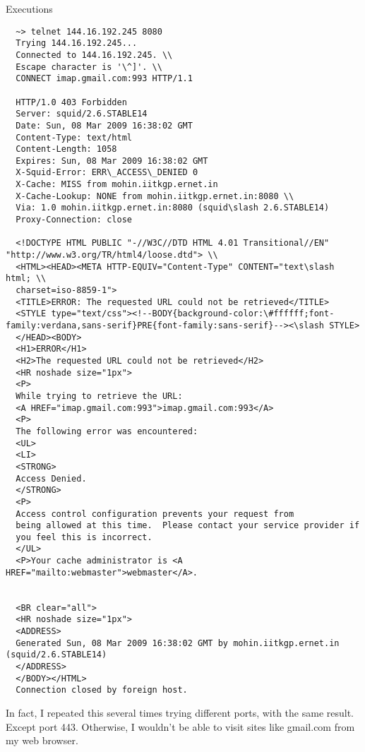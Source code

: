 Executions
\begin{lstlisting}
  ~> telnet 144.16.192.245 8080
  Trying 144.16.192.245...
  Connected to 144.16.192.245. \\
  Escape character is '\^]'. \\
  CONNECT imap.gmail.com:993 HTTP/1.1

  HTTP/1.0 403 Forbidden
  Server: squid/2.6.STABLE14
  Date: Sun, 08 Mar 2009 16:38:02 GMT
  Content-Type: text/html
  Content-Length: 1058
  Expires: Sun, 08 Mar 2009 16:38:02 GMT
  X-Squid-Error: ERR\_ACCESS\_DENIED 0
  X-Cache: MISS from mohin.iitkgp.ernet.in
  X-Cache-Lookup: NONE from mohin.iitkgp.ernet.in:8080 \\
  Via: 1.0 mohin.iitkgp.ernet.in:8080 (squid\slash 2.6.STABLE14)
  Proxy-Connection: close

  <!DOCTYPE HTML PUBLIC "-//W3C//DTD HTML 4.01 Transitional//EN" "http://www.w3.org/TR/html4/loose.dtd"> \\
  <HTML><HEAD><META HTTP-EQUIV="Content-Type" CONTENT="text\slash html; \\
  charset=iso-8859-1">
  <TITLE>ERROR: The requested URL could not be retrieved</TITLE>
  <STYLE type="text/css"><!--BODY{background-color:\#ffffff;font-family:verdana,sans-serif}PRE{font-family:sans-serif}--><\slash STYLE>
  </HEAD><BODY>
  <H1>ERROR</H1>
  <H2>The requested URL could not be retrieved</H2>
  <HR noshade size="1px">
  <P>
  While trying to retrieve the URL:
  <A HREF="imap.gmail.com:993">imap.gmail.com:993</A>
  <P>
  The following error was encountered:
  <UL>
  <LI>
  <STRONG>
  Access Denied.
  </STRONG>
  <P>
  Access control configuration prevents your request from
  being allowed at this time.  Please contact your service provider if
  you feel this is incorrect.
  </UL>
  <P>Your cache administrator is <A HREF="mailto:webmaster">webmaster</A>.


  <BR clear="all">
  <HR noshade size="1px">
  <ADDRESS>
  Generated Sun, 08 Mar 2009 16:38:02 GMT by mohin.iitkgp.ernet.in (squid/2.6.STABLE14)
  </ADDRESS>
  </BODY></HTML>
  Connection closed by foreign host.
\end{lstlisting}

In fact, I repeated this several times trying different ports, with the same result. Except port 443. Otherwise, I wouldn't be able to visit sites like gmail.com from my web browser.

